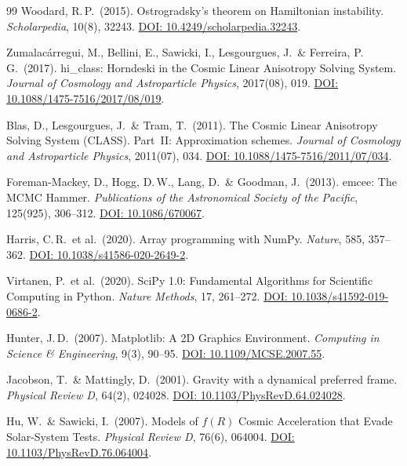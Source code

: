 \documentclass[aps,prd,twocolumn,superscriptaddress,nofootinbib]{revtex4-2}
\begin{document}
\begin{thebibliography}{99}
Woodard, R.\,P.\ (2015).
Ostrogradsky's theorem on Hamiltonian instability.
\textit{Scholarpedia}, 10(8), 32243.
\href{https://doi.org/10.4249/scholarpedia.32243}{DOI: 10.4249/scholarpedia.32243}.

Zumalac\'arregui, M., Bellini, E., Sawicki, I., Lesgourgues, J.\ \& Ferreira, P.\,G.\ (2017).
hi\_class: Horndeski in the Cosmic Linear Anisotropy Solving System.
\textit{Journal of Cosmology and Astroparticle Physics}, 2017(08), 019.
\href{https://doi.org/10.1088/1475-7516/2017/08/019}{DOI: 10.1088/1475-7516/2017/08/019}.

Blas, D., Lesgourgues, J.\ \& Tram, T.\ (2011).
The Cosmic Linear Anisotropy Solving System (CLASS). Part~II: Approximation schemes.
\textit{Journal of Cosmology and Astroparticle Physics}, 2011(07), 034.
\href{https://doi.org/10.1088/1475-7516/2011/07/034}{DOI: 10.1088/1475-7516/2011/07/034}.

Foreman-Mackey, D., Hogg, D.\,W., Lang, D.\ \& Goodman, J.\ (2013).
emcee: The MCMC Hammer.
\textit{Publications of the Astronomical Society of the Pacific}, 125(925), 306--312.
\href{https://doi.org/10.1086/670067}{DOI: 10.1086/670067}.

Harris, C.\,R.\ et al.\ (2020).
Array programming with NumPy.
\textit{Nature}, 585, 357--362.
\href{https://doi.org/10.1038/s41586-020-2649-2}{DOI: 10.1038/s41586-020-2649-2}.

Virtanen, P.\ et al.\ (2020).
SciPy 1.0: Fundamental Algorithms for Scientific Computing in Python.
\textit{Nature Methods}, 17, 261--272.
\href{https://doi.org/10.1038/s41592-019-0686-2}{DOI: 10.1038/s41592-019-0686-2}.

Hunter, J.\,D.\ (2007).
Matplotlib: A 2D Graphics Environment.
\textit{Computing in Science \& Engineering}, 9(3), 90--95.
\href{https://doi.org/10.1109/MCSE.2007.55}{DOI: 10.1109/MCSE.2007.55}.

Jacobson, T.\ \& Mattingly, D.\ (2001).
Gravity with a dynamical preferred frame.
\textit{Physical Review D}, 64(2), 024028.
\href{https://doi.org/10.1103/PhysRevD.64.024028}{DOI: 10.1103/PhysRevD.64.024028}.

Hu, W.\ \& Sawicki, I.\ (2007).
Models of $f(R)$ Cosmic Acceleration that Evade Solar-System Tests.
\textit{Physical Review D}, 76(6), 064004.
\href{https://doi.org/10.1103/PhysRevD.76.064004}{DOI: 10.1103/PhysRevD.76.064004}.


\end{thebibliography}
\end{document}
